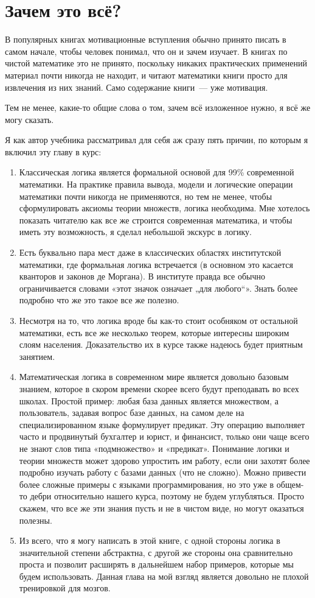 \section{Зачем это всё?}

В популярных книгах мотивационные вступления обычно принято писать в самом начале, чтобы человек понимал, что он и зачем изучает. В книгах по чистой математике это не принято, поскольку никаких практических применений материал почти никогда не находит, и читают математики книги просто для извлечения из них знаний. Само содержание книги~— уже мотивация.

Тем не менее, какие-то общие слова о том, зачем всё изложенное нужно, я всё же могу сказать.

Я как автор учебника рассматривал для себя аж сразу пять причин, по которым я включил эту главу в курс:

\begin{enumerate}
\item Классическая логика является формальной основой для 99\% современной математики. На практике правила вывода, модели и логические операции математики почти никогда не применяются, но тем не менее, чтобы сформулировать аксиомы теории множеств, логика необходима. Мне хотелось показать читателю как все же строится современная математика, и чтобы иметь эту возможность, я сделал небольшой экскурс в логику.
\item Есть буквально пара мест даже в классических областях институтской математики, где формальная логика встречается (в основном это касается кванторов и законов де Моргана). В институте правда все обычно ограничивается словами «этот значок означает „для любого“». Знать более подробно что же это такое все же полезно.
\item Несмотря на то, что логика вроде бы как-то стоит особняком от остальной математики, есть все же несколько теорем, которые интересны широким слоям населения. Доказательство их в курсе также надеюсь будет приятным занятием.
\item Математическая логика в современном мире является довольно базовым знанием, которое в скором времени скорее всего будут преподавать во всех школах. Простой пример: любая база данных является множеством, а пользователь, задавая вопрос базе данных, на самом деле на специализированном языке формулирует предикат. Эту операцию выполняет часто и продвинутый бухгалтер и юрист, и финансист, только они чаще всего не знают слов типа «подмножество» и «предикат». Понимание логики и теории множеств может здорово упростить им работу, если они захотят более подробно изучать работу с базами данных (что не сложно). Можно привести более сложные примеры с языками программирования, но это уже в общем-то дебри относительно нашего курса, поэтому не будем углубляться. Просто скажем, что все же эти знания пусть и не в чистом виде, но могут оказаться полезны.
\item Из всего, что я могу написать в этой книге, с одной стороны логика в значительной степени абстрактна, с другой же стороны она сравнительно проста и позволит расширять в дальнейшем набор примеров, которые мы будем использовать. Данная глава на мой взгляд является довольно не плохой тренировкой для мозгов.
\end{enumerate}

